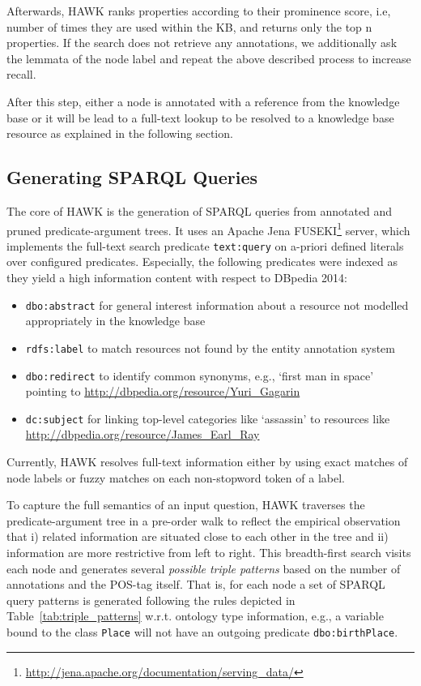 Afterwards, HAWK ranks properties according to their prominence score, i.e, number of times they are used within the \ac{KB}, and returns only the top n properties.
If the search does not retrieve any annotations, we additionally ask the lemmata of the node label and repeat the above described process to increase recall.

After this step, either a node is annotated with a reference from the knowledge base %
or it will be lead to a full-text lookup to be resolved to a knowledge base resource as explained in the following section.


\subsection{Generating SPARQL Queries}
\label{chahawk:sec:full-text}

The core of HAWK is the generation of SPARQL queries from annotated and pruned predicate-argument trees.
It uses an Apache Jena FUSEKI\footnote{\url{http://jena.apache.org/documentation/serving_data/}} server, which implements the full-text search predicate \texttt{text:query} on a-priori defined literals over configured predicates. %
Especially, the following predicates were indexed as they yield a high information content with respect to DBpedia 2014:
\begin{itemize}
 \item \texttt{dbo:abstract} for general interest information about a resource not modelled appropriately in the knowledge base
 \item \texttt{rdfs:label} to match resources not found by the entity annotation system%
 \item \texttt{dbo:redirect} to identify common synonyms, e.g., `first man in space' pointing to \url{http://dbpedia.org/resource/Yuri_Gagarin}
 \item \texttt{dc:subject} for linking top-level categories like `assassin' to resources like \url{http://dbpedia.org/resource/James_Earl_Ray}
\end{itemize}
Currently, HAWK resolves full-text information either by using exact matches of node labels or fuzzy matches on each non-stopword token of a label.

To capture the full semantics of an input question, HAWK traverses the pre\-dicate-argument tree in a pre-order walk to reflect the empirical observation that i) related information are situated close to each other in the tree and ii) information are more restrictive from left to right.
This breadth-first search visits each node and generates several \emph{possible triple patterns} based on the number of annotations and the POS-tag itself. 
That is, for each node a set of SPARQL query patterns is generated following the rules depicted in Table~\ref{tab:triple_patterns} w.r.t. ontology type information, e.g., a variable bound to the class \texttt{Place} will not have an outgoing predicate \texttt{dbo:birthPlace}.

